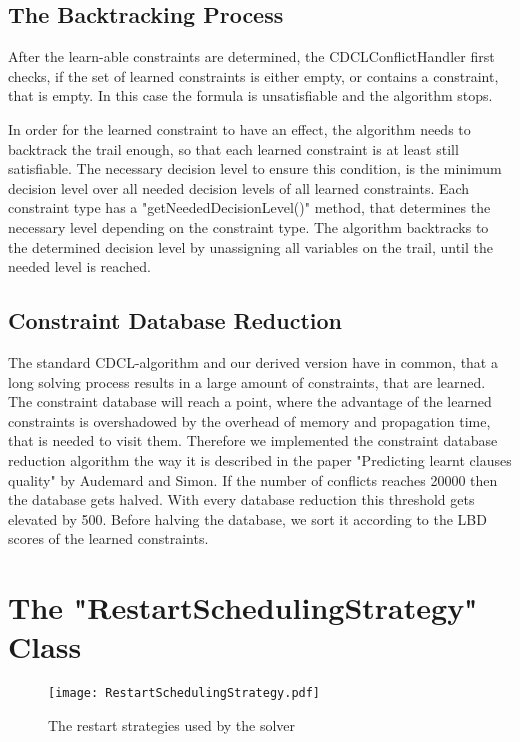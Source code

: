 \subsection{The Backtracking Process}

After the learn-able constraints are determined, the CDCLConflictHandler first checks, if the set of learned constraints is either empty, or contains a constraint, that is empty. In this case the formula is unsatisfiable and the algorithm stops.
\par
In order for the learned constraint to have an effect, the algorithm needs to backtrack the trail enough, so that each learned constraint is at least still satisfiable. The necessary decision level to ensure this condition, is the minimum decision level over all needed decision levels of all learned constraints. Each constraint type has a "getNeededDecisionLevel()" method, that determines the necessary level depending on the constraint type. The algorithm backtracks to the determined decision level by unassigning all variables on the trail, until the needed level is reached.

\subsection{Constraint Database Reduction}

The standard CDCL-algorithm and our derived version have in common, that a long solving process results in a large amount of constraints, that are learned. The constraint database will reach a point, where the advantage of the learned constraints is overshadowed by the overhead of memory and propagation time, that is needed to visit them. Therefore we implemented the constraint database reduction algorithm the way it is described in the paper "Predicting learnt clauses quality" \cite{audemard2009predicting} by Audemard and Simon. If the number of conflicts reaches 20000 then the database gets halved. With every database reduction this threshold gets elevated by 500. Before halving the database, we sort it according to the LBD scores of the learned constraints.

\section{The "RestartSchedulingStrategy" Class}

\begin{figure}[htbp]
  \centering
  \texttt{[image: RestartSchedulingStrategy.pdf]}	
  \caption{The restart strategies used by the solver}
  \label{fig:restartScheduling}
\end{figure}


